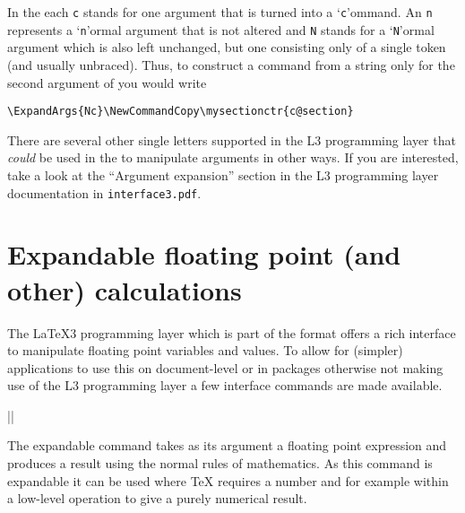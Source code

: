 \documentclass{ltxguide}
\begin{document}
In the  each \texttt{c} stands for one argument that is
turned into a `\texttt{c}'ommand. An \texttt{n} represents a
`\texttt{n}'ormal argument that is not altered and \texttt{N} stands for
a `\texttt{N}'ormal argument which is also left unchanged, but one
consisting only of a single token (and usually unbraced). Thus, to
construct a command from a string only for the second argument of
 you would write
\begin{verbatim}
\ExpandArgs{Nc}\NewCommandCopy\mysectionctr{c@section}
\end{verbatim}
There are several other single letters supported in the L3 programming
layer that \emph{could} be used in the  to manipulate
arguments in other ways.  If you are interested, take a look at the
\enquote{Argument expansion} section in the L3 programming layer
documentation in \texttt{interface3.pdf}.



\section{Expandable floating point (and other) calculations}

The \LaTeX3 programming layer which is part of the format offers a
rich interface to manipulate floating point variables and values. To
allow for (simpler) applications to use this on document-level or in
packages otherwise not making use of the L3 programming layer a few
interface commands are made available.


\begin{decl}
  |\fpeval| 
\end{decl}

The expandable command  takes as its argument a floating
point expression and produces a result using the normal rules of
mathematics. As this command is expandable it can be used where \TeX{}
requires a number and for example within a low-level  operation
to give a purely numerical result.
\end{document}
